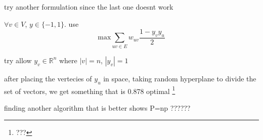 \documentclass{article}
\theoremstyle{definition}
\newcommand{\abs}[1]{\left| #1 \right|}
\begin{document}
try another formulation since the last one doesnt work

\(\forall v\in V\), \(y\in \{-1,1\}\). use
\begin{equation}
    \text{max}\sum_{uv\in E} w_{uv}\frac{1-y_vy_u}{2}
\end{equation} 

try allow \(y_v\in \mathbb R^n\) where \(\abs{v}=n\), \(\abs{y_v} = 1\)

after placing the vertecies of \(y_u\) in space, taking random hyperplane to divide the set of vectors, we get something that is 0.878 optimal \footnote{???}


finding another algorithm that is better shows P=np ??????
\end{document}
